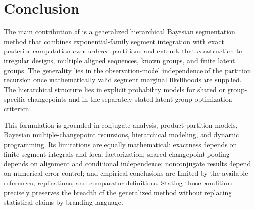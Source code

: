 \section{Conclusion}
The main contribution of \BayesBreak is a generalized hierarchical Bayesian segmentation method
that combines exponential-family segment integration with exact posterior computation over
ordered partitions and extends that construction to irregular designs, multiple aligned sequences,
known groups, and finite latent groups. The generality lies in the observation-model independence of
the partition recursion once mathematically valid segment marginal likelihoods are supplied. The
hierarchical structure lies in explicit probability models for shared or group-specific
changepoints and in the separately stated latent-group optimization criterion.

This formulation is grounded in conjugate analysis, product-partition models, Bayesian
multiple-changepoint recursions, hierarchical modeling, and dynamic programming. Its limitations
are equally mathematical: exactness depends on finite segment integrals and local factorization;
shared-changepoint pooling depends on alignment and conditional independence; nonconjugate results
depend on numerical error control; and empirical conclusions are limited by the available
references, replications, and comparator definitions. Stating those conditions precisely preserves
the breadth of the generalized method without replacing statistical claims by branding language.

